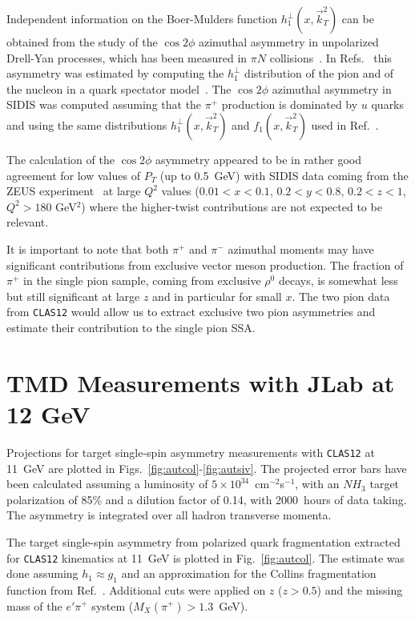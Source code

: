 Independent information on the Boer-Mulders function 
$h_1^{\perp}(x, \Vec k_T^2)$ can be obtained from the study of the $\cos 2\phi$
azimuthal asymmetry in unpolarized Drell-Yan processes, which has been
measured in $\pi N$ collisions~\cite{Falciano:1986wk,Conway:1989fs}.
In Refs.~\cite{Lu:2004hu,Lu:2005rq} this asymmetry was estimated by computing 
the $h_1^{\perp}$ distribution of the pion and of the nucleon in a quark 
spectator model~\cite{Jakob:1997wg,Bacchetta:2003rz}.  The $\cos 2\phi$ 
azimuthal asymmetry in SIDIS was computed assuming that the $\pi^+$ production 
is dominated by $u$ quarks and using the same distributions
$h_1^{\perp} (x, \Vec k_T^2)$ and $f_1 (x, \Vec k_T^2)$ used in 
Ref.~\cite{Lu:2005rq}.

The calculation of the $\cos 2 \phi$ asymmetry appeared to be in rather good 
agreement for low values of $P_T$ (up to 0.5~GeV) with SIDIS data coming 
from the ZEUS experiment~\cite{Breitweg:2000qi} at large $Q^2$ values 
($0.01<x<0.1$, $0.2<y<0.8$, $0.2<z<1$, $Q^2 > 180$ GeV$^2$) where the 
higher-twist contributions are not expected to be relevant.

It is important to note that both $\pi^+$ and $\pi^-$ azimuthal moments may
have significant contributions from exclusive vector meson production.
The fraction of $\pi^+$ in the single pion sample, coming from exclusive 
$\rho^0$ decays, is somewhat less but still significant at large $z$ and in 
particular for small $x$.  The two pion data from {\tt CLAS12} would allow us
to extract exclusive two pion asymmetries and estimate their contribution to 
the single pion SSA.

\section{TMD Measurements with JLab at 12 GeV}

Projections for target single-spin asymmetry measurements with {\tt CLAS12} 
at 11~GeV are plotted in Figs.~\ref{fig:autcol}-\ref{fig:autsiv}.  The 
projected error bars have been calculated assuming a luminosity of
$5\times 10^{34}$~cm$^{-2}$s$^{-1}$, with an $NH_3$ target polarization of 
85\% and a dilution factor of 0.14, with 2000~hours of data taking.
The asymmetry is integrated over all hadron transverse momenta.

The target single-spin asymmetry from polarized quark fragmentation
extracted for {\tt CLAS12} kinematics at 11~GeV is plotted in 
Fig.~\ref{fig:autcol}.  The estimate was done assuming $h_1 \approx g_1$ and 
an approximation for the Collins fragmentation function from 
Ref.~\cite{Efremov:2002ut}.  Additional cuts were applied on $z$ ($z>0.5$) 
and the missing mass of the $e'\pi^+$ system ($M_X(\pi^+)>1.3$~GeV). 

